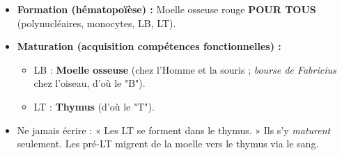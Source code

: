 \documentclass[11pt]{article}
\begin{document}
\begin{attention}
\begin{itemize}
    \item \textbf{Formation (hématopoïèse) :} Moelle osseuse rouge \textbf{POUR TOUS} (polynucléaires, monocytes, LB, LT).
    \item \textbf{Maturation (acquisition compétences fonctionnelles) :}
    \begin{itemize}
        \item LB : \textbf{Moelle osseuse} (chez l'Homme et la souris ; \emph{bourse de Fabricius} chez l'oiseau, d'où le "B").
        \item LT : \textbf{Thymus} (d'où le "T").
    \end{itemize}
    \item Ne jamais écrire : « Les LT se forment dans le thymus. » Ils s'y \emph{maturent} seulement. Les pré-LT migrent de la moelle vers le thymus via le sang.
\end{itemize}
\end{attention}
\end{document}

